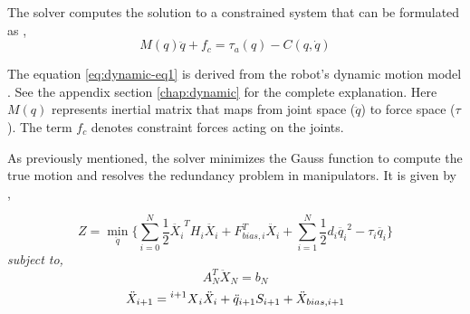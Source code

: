  The solver computes the solution to a constrained system that can be formulated as \cite{shakhimardanov2015composable}, 
 \begin{equation}\label{eq:dynamic-eq1}
		 M(q)\ddot{q} + f_c = \tau_a(q) - C(q, \dot{q})
 \end{equation}
 
 
 The equation \ref{eq:dynamic-eq1} is derived from the robot's dynamic motion model \cite{shakhimardanov2015composable}. See the appendix section \autoref{chap:dynamic} for the complete explanation.
 Here $M(q)$ represents inertial matrix that maps from joint space ($\ddot{q}$) to force space ($\tau$). The term  $f_c$ denotes constraint forces acting on the joints.
 
As previously mentioned, the solver minimizes the Gauss function to compute the true motion and resolves the redundancy problem in manipulators. It is given by \cite{vereshchagin1989modeling}, 

 


% 
 \begin{equation} \label{eq:gauss}
	Z = \min_{\ddot{q}} \Big \{\sum_{i=0}^{N} \frac{1}{2} \ddot{X_i}^T H_i \ddot{X_i} + F_{bias, i}^T\ddot{X_i} + \sum_{i=1}^{N} \frac{1}{2} d_i \ddot{q_i}^2 - \tau_i \ddot{q_i} \Big \}
 \end{equation} 
\hspace{70pt}\textit{subject to,}
\begin{equation} \label{eq:constraint1}
A_N^T \ddot{X}_N = b_N
\end{equation} 
\begin{equation} \label{eq:constraint2}
\ddot{X}_{i+1} = \prescript{i+1}{}{X}_i \ddot{X}_i + \ddot{q}_{i+1} S_{i+1} + \ddot{X}_{bias, i+1}
\end{equation} 

